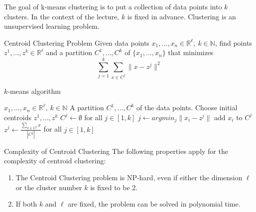 \documentclass[english]{panikzettel}
\begin{document}
\begin{halfboxl}
\vspace{-\baselineskip}
The goal of k-means clustering is to put a collection of data points into $k$ clusters. In the context of the lecture, $k$ is fixed in advance. Clustering is an unsupervised learning problem.

\begin{defi}{Centroid Clustering Problem}
Given data points $x_1,..., x_n\in\mathbb{R}^\ell, \ k\in\mathbb{N}$, find points $z^1,...,z^k\in\mathbb{R}^\ell$ and a partition $C^1,...,C^k$ of $\{x_1,...,x_n \}$ that minimizes
\[
\sum_{j=1}^k \sum_{x\in C^j} \parallel x-z^j \parallel^2
\]
\end{defi}

\end{halfboxl}
\begin{halfboxr}
\vspace{-\baselineskip}

\begin{algo}{$k$-means algorithm}
{
\renewcommand{\algorithmicrequire}{\textbf{Input:}}
\renewcommand{\algorithmicensure}{\textbf{Output:}}
  \begin{algorithmic}[1]
  \Require $x_1,...,x_n\in\mathbb{R}^\ell, \ k\in\mathbb{N}$
  \Ensure A partition $C^1, ..., C^k$ of the data points.
  \State Choose initial centroids $z^1,...,z^k$ %
  \Repeat
  \State $C^j \leftarrow \emptyset$ for all $j\in [1,k]$
  	\State $j\leftarrow argmin_j \parallel x_i - z^j \parallel$ %
  	\State add $x_i$ to $C^j$
  \EndFor
  \State $z^j\leftarrow \frac{\sum_{x\in C^j}x}{|C^j|}$ for all $j\in [1,k]$
  \end{algorithmic}
}
\end{algo}

\end{halfboxr}


\begin{theo}{Complexity of Centroid Clustering}
The following properties apply for the complexity of centroid clustering:
\begin{enumerate}
\item The Centroid Clustering problem is NP-hard, even if either the dimension $\ell$ or the cluster number $k$ is fixed to be $2$.
\item If both $k$ and $\ell$ are fixed, the problem can be solved in polynomial time.
\end{enumerate}
\end{theo}
\end{document}
